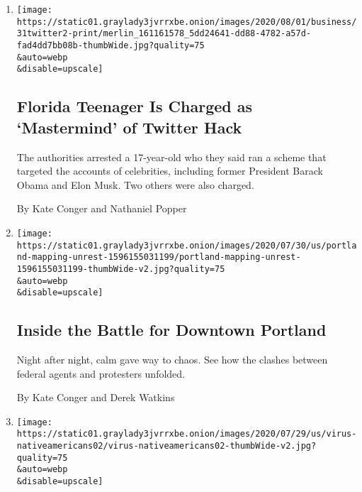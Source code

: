 \begin{enumerate}
\def\labelenumi{\arabic{enumi}.}
\item
  \href{/2020/07/31/technology/twitter-hack-arrest.html}{}

  \texttt{[image: https://static01.graylady3jvrrxbe.onion/images/2020/08/01/business/31twitter2-print/merlin\_161161578\_5dd24641-dd88-4782-a57d-fad4dd7bb08b-thumbWide.jpg?quality=75\\\&auto=webp\\\&disable=upscale]}

  \hypertarget{florida-teenager-is-charged-as-mastermind-of-twitter-hack}{%
  \subsection{Florida Teenager Is Charged as `Mastermind' of Twitter
  Hack}\label{florida-teenager-is-charged-as-mastermind-of-twitter-hack}}

  The authorities arrested a 17-year-old who they said ran a scheme that
  targeted the accounts of celebrities, including former President
  Barack Obama and Elon Musk. Two others were also charged.

  By Kate Conger and Nathaniel Popper
\item
  \href{/interactive/2020/07/31/us/portland-protests-map-photos.html}{}

  \texttt{[image: https://static01.graylady3jvrrxbe.onion/images/2020/07/30/us/portland-mapping-unrest-1596155031199/portland-mapping-unrest-1596155031199-thumbWide-v2.jpg?quality=75\\\&auto=webp\\\&disable=upscale]}

  \hypertarget{inside-the-battle-for-downtown-portland}{%
  \subsection{Inside the Battle for Downtown
  Portland}\label{inside-the-battle-for-downtown-portland}}

  Night after night, calm gave way to chaos. See how the clashes between
  federal agents and protesters unfolded.

  By Kate Conger and Derek Watkins
\item
  \href{/2020/07/30/us/native-americans-coronavirus-data.html}{}

  \texttt{[image: https://static01.graylady3jvrrxbe.onion/images/2020/07/29/us/virus-nativeamericans02/virus-nativeamericans02-thumbWide-v2.jpg?quality=75\\\&auto=webp\\\&disable=upscale]}

  \hypertarget{native-americans-feel-devastated-by-the-virus-yet-overlooked-in-the-data}{%
}
\end{enumerate}
